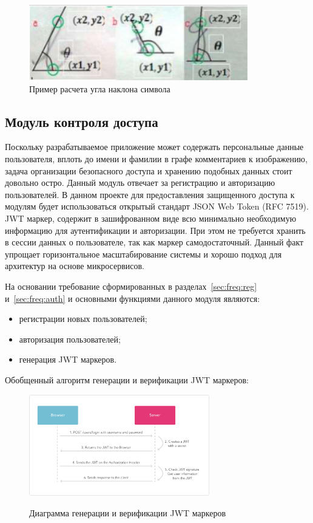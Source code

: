 \begin{figure}[ht]
    \centering
    \includegraphics[width=0.85\textwidth]{figures/char_angle.png}
    \caption{Пример расчета угла наклона символа}
    \label{fig:architecture:symbol_angle}
\end{figure}

\subsection{Модуль контроля доступа}
Поскольку разрабатываемое приложение может содержать персональные данные пользователя, вплоть до имени и фамилии в графе комментариев к изображению, задача организации безопасного доступа и хранению подобных данных стоит довольно остро.
Данный модуль отвечает за регистрацию и авторизацию пользователей. 
В данном проекте для предоставления защищенного доступа к модулям будет использоваться открытый стандарт JSON Web Token (RFC 7519). JWT маркер, содержит в зашифрованном виде всю минимально необходимую информацию для аутентификации и авторизации. При этом не требуется хранить в сессии данных о пользователе, так как маркер самодостаточный. Данный факт упрощает горизонтальное масштабирование системы и хорошо подход для архитектур на основе микросервисов.

На основании требование сформированных в разделах~\ref{sec:freq:reg} и~\ref{sec:freq:auth} и основными функциями данного модуля являются:
\begin{itemize}
  \item регистрации новых пользователей;
  \item авторизация пользователей;
  \item генерация JWT маркеров.
\end{itemize}

Обобщенный алгоритм генерации и верификации JWT маркеров:
\begin{figure}[ht]
    \centering
    \includegraphics[width=0.7\textwidth]{figures/jwt_diagram.png}
    \label{fig:architecture:jwt_diagram}
    \caption{Диаграмма генерации и верификации JWT маркеров}
\end{figure}

